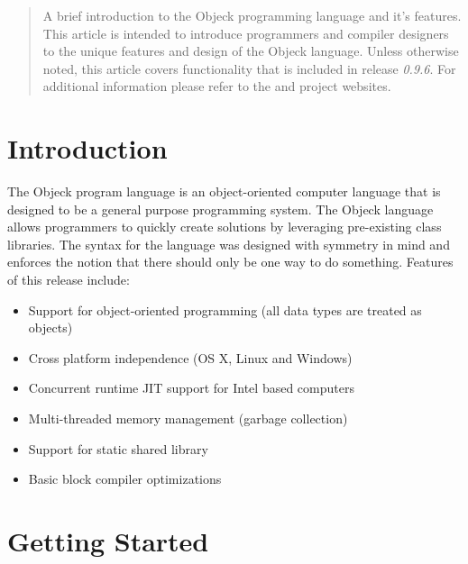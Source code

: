 \documentclass[12pt]{article}
\begin{document}
\maketitle
\thispagestyle{empty}

\vspace{\baselineskip}

\begin{abstract}
A brief introduction to the Objeck programming language and it's features.  This article is intended to introduce programmers and compiler designers to the unique features and design of the Objeck language.   Unless otherwise noted, this article covers functionality that is included in release \textit{0.9.6}.  For additional information please refer to the  and  project websites.
\end{abstract}

\newpage
\tableofcontents
\newpage

\label{Introduction}
\section{Introduction}
The Objeck program language is an object-oriented computer language that is designed to be a general purpose programming system.  The Objeck language allows programmers to quickly create solutions by leveraging pre-existing class libraries.  The syntax for the language was designed with symmetry in mind and enforces the notion that there should only be one way to do something. Features of this release include:
\begin{itemize}
	\item Support for object-oriented programming (all data types are treated as objects)
	\item Cross platform independence (OS X, Linux and Windows)
	\item Concurrent runtime JIT support for Intel based computers
	\item Multi-threaded memory management (garbage collection)
	\item Support for static shared library
	\item Basic block compiler optimizations
\end{itemize}

\section{Getting Started}
\end{document}
